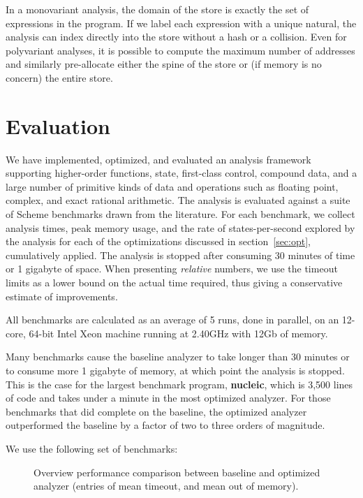 \documentclass[preprint,onecolumn,9pt]{sigplanconf} %
\begin{document}
In a monovariant analysis, the domain of the store is
exactly the set of expressions in the program.
%
If we label each expression with a unique natural, the analysis can
index directly into the store without a hash or a collision.
%
Even for polyvariant analyses, it is possible to compute the maximum
number of addresses and similarly pre-allocate either the spine of the
store or (if memory is no concern) the entire store.

\section{Evaluation}
\label{sec:eval}

We have implemented, optimized, and evaluated an analysis framework
supporting higher-order functions, state, first-class control,
compound data, and a large number of primitive kinds of data and
operations such as floating point, complex, and exact rational
arithmetic.  The analysis is evaluated against a suite of Scheme benchmarks
drawn from the literature.
%
For each benchmark, we collect analysis times, peak memory usage, and
the rate of states-per-second explored by the analysis for each of the
optimizations discussed in section~\ref{sec:opt}, cumulatively
applied.  The analysis is stopped after consuming 30 minutes of time
or 1 gigabyte of space.  When presenting \emph{relative} numbers, we
use the timeout limits as a lower bound on the actual time required,
thus giving a conservative estimate of improvements.

All benchmarks are calculated as an average of 5 runs, done in
parallel, on an 12-core, 64-bit Intel Xeon machine running at 2.40GHz
with 12Gb of memory.

Many benchmarks cause the baseline analyzer to take longer than 30
minutes or to consume more 1 gigabyte of memory, at which point the
analysis is stopped.  This is the case for the largest benchmark
program, {\bf nucleic}, which is 3,500 lines of code and takes under a minute in the
most optimized analyzer.  For those benchmarks that did complete on
the baseline, the optimized analyzer outperformed the baseline by a
factor of two to three orders of magnitude.

We use the following set of benchmarks:
\begin{figure}
\centering

\caption{Overview performance comparison between baseline and
  optimized analyzer (entries of  mean timeout, and  mean out of memory).}
\label{fig:bench-overview}
\end{figure}
\end{document}
